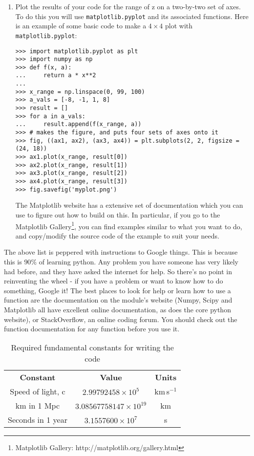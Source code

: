 \documentclass[]{article}
\begin{document}
\begin{enumerate}
\item Plot the results of your code for the range of z on a two-by-two set of axes. To do this you will use \texttt{matplotlib.pyplot} and its associated functions. Here is an example of some basic code to make a $4\times 4$ plot with \texttt{matplotlib.pyplot}:
\begin{lstlisting}
>>> import matplotlib.pyplot as plt
>>> import numpy as np
>>> def f(x, a):
...     return a * x**2
...     
>>> x_range = np.linspace(0, 99, 100)
>>> a_vals = [-8, -1, 1, 8]
>>> result = []
>>> for a in a_vals:
...     result.append(f(x_range, a))
>>> # makes the figure, and puts four sets of axes onto it
>>> fig, ((ax1, ax2), (ax3, ax4)) = plt.subplots(2, 2, figsize = (24, 18))
>>> ax1.plot(x_range, result[0])
>>> ax2.plot(x_range, result[1])
>>> ax3.plot(x_range, result[2])
>>> ax4.plot(x_range, result[3])
>>> fig.savefig('myplot.png')
\end{lstlisting}
The Matplotlib website has a extensive set of documentation which you can use to figure out how to build on this. In particular, if you go to the Matplotlib Gallery\footnote{Matplotlib Gallery: http://matplotlib.org/gallery.html}, you can find examples similar to what you want to do, and copy/modify the source code of the example to suit your needs. \\

\end{enumerate}

\noindent The above list is peppered with instructions to Google things. This is because this is $90\%$ of learning python. Any problem you have someone has very likely had before, and they have asked the internet for help. So there's no point in reinventing the wheel - if you have a problem or want to know how to do something, Google it! The best places to look for help or learn how to use a function are the documentation on the module's website (Numpy, Scipy and Matplotlib all have excellent online documentation, as does the core python website), or StackOverflow, an online coding forum. You should check out the function documentation for any function before you use it. \\

\begin{table}[h!]
\caption{Required fundamental constants for writing the code}
\centering
\label{table:constants}
\begin{tabular}{c c c}
\\ [0.05ex]
\hline
\textbf{Constant} & \textbf{Value} & \textbf{Units} \\ [0.5ex]
Speed of light, c & $2.99792458\times 10^5$ & km$\,$s$^{-1}$\\
km in 1 Mpc & $3.08567758147\times 10^{19}$ & km\\
Seconds in 1 year & $3.1557600\times 10^7$ & s\\
\hline
\end{tabular}
\end{table}
\end{document}
